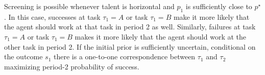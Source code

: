 \documentclass[12pt,american]{paper}
\theoremstyle{remark}
\begin{document}
Screening is possible whenever talent is horizontal and $p_1$ is sufficiently close to $p^\star$. In this case, successes at task $\tau_1=A$ or task $\tau_1=B$ make it more likely that the agent should work at that task in period 2 as well. Similarly, failures at task $\tau_1=A$ or task $\tau_1=B$ makes it more likely that the agent should work at the other task in period 2. If the initial prior is sufficiently uncertain, conditional on the outcome $s_1$ there is a one-to-one correspondence between $\tau_1$ and $\tau_2$ maximizing period-2 probability of success.






\end{document}
